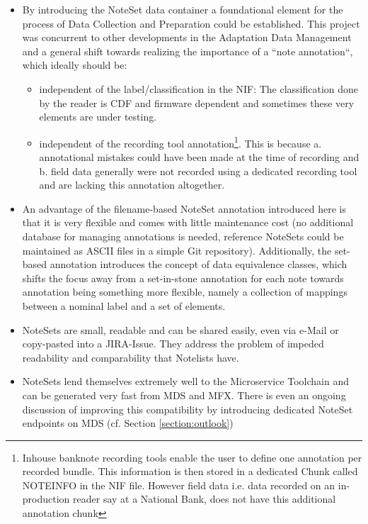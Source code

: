\begin{itemize}
\item By introducing the NoteSet data container a foundational element for the process of Data Collection and Preparation could be established. This project was concurrent to other developments in the Adaptation Data Management and a general shift towards realizing the importance of a ``note annotation``, which ideally should be:
	\begin{itemize}
		\item independent of the label/classification in the NIF: The classification done by the reader is CDF and firmware dependent and sometimes these very elements are under testing.
		\item independent of the recording tool annotation\footnote{Inhouse banknote recording tools enable the user to define one annotation per recorded bundle. This information is then stored in a dedicated Chunk called NOTEINFO in the NIF file. However field data i.e. data recorded on an in-production reader say at a National Bank, does not have this additional annotation chunk}. This is because a. annotational mistakes could have been made at the time of recording and b. field data generally were not recorded using a dedicated recording tool and are lacking this annotation altogether. 
	\end{itemize}
\item An advantage of the filename-based NoteSet annotation introduced here is that it is very flexible and comes with little maintenance cost (no additional database for managing annotations is needed, reference NoteSets could be maintained as ASCII files in a simple Git repository). Additionally, the set-based annotation introduces the concept of data equivalence classes, which shifts the focus away from a set-in-stone annotation for each note towards annotation being something more flexible, namely a collection of mappings between a nominal label and a set of elements.
\item NoteSets are small, readable and can be shared easily, even via e-Mail or copy-pasted into a JIRA-Issue. They address the problem of impeded readability and comparability that Notelists have.
\item NoteSets lend themselves extremely well to the Microservice Toolchain and can be generated very fast from MDS and MFX. There is even an ongoing discussion of improving this compatibility by introducing dedicated NoteSet endpoints on MDS (cf. Section \ref{section:outlook})
\end{itemize}



